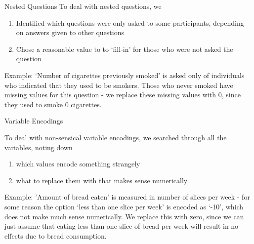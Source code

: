 \documentclass[10pt]{beamer} %
\begin{document}
\begin{frame}[plain]{Nested Questions}
To deal with nested questions, we 
\vspace{0.4cm}

\begin{enumerate}
\item Identified which questions were only asked to some participants, depending on answers given to other questions
\item Chose a reasonable value to to `fill-in' for those who were not asked the question
\end{enumerate}
\vspace{0.4cm}

Example:
`Number of cigarettes previously smoked' is asked only of individuals who indicated that they used to be smokers. Those who never smoked have missing values for this question - we replace these missing values with 0, since they used to smoke 0 cigarettes. 

\end{frame}

\begin{frame}[plain]{Variable Encodings}

To deal with non-sensical variable encodings, we searched through all the variables, noting down 
\vspace{0.4cm}

\begin{enumerate}
\item which values encode something strangely   \\

\item what to replace them with that makes sense numerically \\

\end{enumerate}

\vspace{0.4cm}

Example: 'Amount of bread eaten' is measured in number of slices per week - for some reason the option `less than one slice per week' is encoded as `-10', which does not make much sense numerically. We replace this with zero, since we can just assume that eating less than one slice of bread per week will result in no effects due to bread consumption. 


\end{frame}
\end{document}
